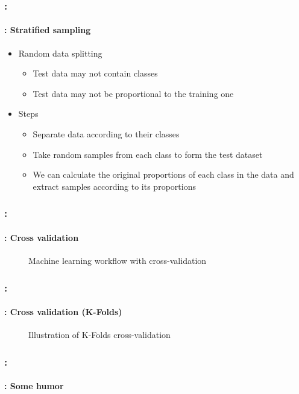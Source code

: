 \documentclass[xcolor=table]{beamer}
\begin{document}
\begin{frame}
	\frametitle{\insertshortsubtitle: \insertsection}
	\framesubtitle{\insertsubsection: Stratified sampling}
	
	\begin{itemize}
		\item Random data splitting
		\begin{itemize}
			\item Test data may not contain classes
			\item Test data may not be proportional to the training one
		\end{itemize}
		\item Steps
		\begin{itemize}
			\item Separate data according to their classes
			\item Take random samples from each class to form the test dataset
			\item We can calculate the original proportions of each class in the data and extract samples according to its proportions
		\end{itemize}
	\end{itemize}
	
\end{frame}

\begin{frame}
	\frametitle{\insertshortsubtitle: \insertsection}
	\framesubtitle{\insertsubsection: Cross validation}
	
	\begin{figure}
		\centering
		\caption{Machine learning workflow with cross-validation \cite{2020-sklearn-man}}
	\end{figure}
	
\end{frame}


\begin{frame}
	\frametitle{\insertshortsubtitle: \insertsection}
	\framesubtitle{\insertsubsection: Cross validation (K-Folds)}
	
	\begin{figure}
		\centering
		\caption{Illustration of K-Folds cross-validation \cite{2020-sklearn-man}}
	\end{figure}
	
\end{frame}

\begin{frame}
	\frametitle{\insertshortsubtitle: \insertsection}
	\framesubtitle{\insertsubsection: Some humor}
	
		\begin{center}
		\end{center}
	
\end{frame}
\end{document}
